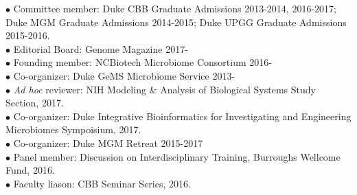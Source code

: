 \documentclass[overlapped,line,11pt]{res}
\begin{document}
\begin{resume}
\vspace{-10mm} \hangindent=0.5in $\bullet$\hspace{.1in} Committee
member: Duke CBB Graduate Admissions 2013-2014, 2016-2017; Duke MGM Graduate
Admissions 2014-2015; Duke UPGG Graduate Admissions 2015-2016. \\

\vspace{-10mm}
\hangindent=0.5in $\bullet$\hspace{.1in} Editorial Board: Genome Magazine
2017- \\

\vspace{-10mm}
\hangindent=0.5in $\bullet$\hspace{.1in} Founding member: NCBiotech
Microbiome Consortium
2016- \\

\vspace{-10mm}
\hangindent=0.5in $\bullet$\hspace{.1in} Co-organizer: Duke GeMS
Microbiome Service 2013- \\

\vspace{-10mm} \hangindent=0.5in $\bullet$\hspace{.1in} \emph{Ad hoc} reviewer:
NIH Modeling \& Analysis of Biological Systems Study Section, 2017. \\

\vspace{-10mm} \hangindent=0.5in $\bullet$\hspace{.1in} Co-organizer:
Duke Integrative Bioinformatics for Investigating and Engineering
Microbiomes Sympoisium, 2017. \\

\vspace{-10mm}
\hangindent=0.5in $\bullet$\hspace{.1in} Co-organizer: 
 Duke MGM Retreat 2015-2017 \\

\vspace{-10mm} \hangindent=0.5in $\bullet$\hspace{.1in} Panel member:
Discussion on Interdisciplinary Training, Burroughs Wellcome Fund, 2016. \\

\vspace{-10mm}
\hangindent=0.5in $\bullet$\hspace{.1in} Faculty liason: CBB Seminar Series, 2016. \\


\end{resume}
\end{document}
